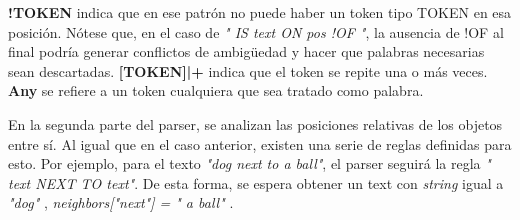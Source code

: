 \textbf{!TOKEN} indica que en ese patr\'on no puede haber un token tipo TOKEN en esa posici\'on. N\'otese que, en el caso de \textit{" IS text ON pos !OF "}, la ausencia de !OF al final podría generar conflictos de ambigüedad y hacer que palabras necesarias sean descartadas. \textbf{[TOKEN]|+} indica que el token se repite una o m\'as veces. \textbf{Any} se refiere a un token cualquiera que sea tratado como palabra.

En la segunda parte del parser, se analizan las posiciones relativas de los objetos entre sí. Al igual que en el caso anterior, existen una serie de reglas definidas para esto. Por ejemplo, para el texto \textit{"dog next to a ball"}, el parser seguirá la regla \textit{" text NEXT TO text"}. De esta forma, se espera obtener un text con \textit{string} igual a \textit{ "dog" }, \textit{neighbors["next"] = " a ball" }.

